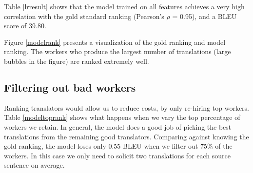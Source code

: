 Table \ref{lrresult} shows that the model trained on all features achieves a very high correlation with the gold standard ranking (Pearson's $\rho$ = 0.95), and a  BLEU score of 39.80.



Figure \ref{modelrank} presents a visualization of the gold ranking and model ranking. The workers who produce the largest number of translations (large bubbles in the figure) are ranked extremely well.


\subsection{Filtering out bad workers}

Ranking translators would allow us to reduce costs, by only re-hiring top workers.
 Table \ref{modeltoprank} shows what happens when we vary the top percentage of workers we retain.  In general, the model does a good job of picking the best translations from the remaining good translators.  Comparing against knowing the gold ranking, the model loses only 0.55 BLEU when we filter out 75\% of the workers.  In this case we only need to solicit two translations for each source sentence on average.



